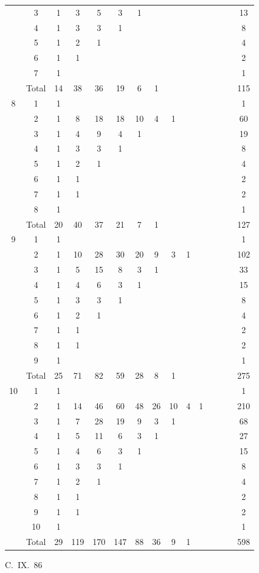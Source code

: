 \documentclass[11pt,a4paper]{article}
\begin{document}
{\begin{center}
\begin{longtable}{|c|c|c|c|c|c|c|c|c|c|c|c|c|c|c|}
  & 3 & 1 & 3 & 5 & 3 & 1 & & & & & & & & 13 \\
  & 4 & 1 & 3 & 3 & 1 & & & & & & & & & 8 \\
  & 5 & 1 & 2 & 1 & & & & & & & & & & 4 \\
  & 6 & 1 & 1 & & & & & & & & & & & 2 \\
  & 7 & 1 & & & & & & & & & & & & 1 \\
  & Total & 14 & 38 & 36 & 19 & 6 & 1 & & & & & & & 115 \\
\hline
8 & 1 & 1 & & & & & & & & & & & & 1 \\
  & 2 & 1 & 8 & 18 & 18 & 10 & 4 & 1 & & & & & & 60 \\
  & 3 & 1 & 4 & 9 & 4 & 1 & & & & & & & & 19 \\
  & 4 & 1 & 3 & 3 & 1 & & & & & & & & & 8 \\
  & 5 & 1 & 2 & 1 & & & & & & & & & & 4 \\
  & 6 & 1 & 1 & & & & & & & & & & & 2 \\
  & 7 & 1 & 1 & & & & & & & & & & & 2 \\
  & 8 & 1 & & & & & & & & & & & & 1 \\
  & Total & 20 & 40 & 37 & 21 & 7 & 1 & & & & & & & 127 \\
\hline
9 & 1 & 1 & & & & & & & & & & & & 1 \\
  & 2 & 1 & 10 & 28 & 30 & 20 & 9 & 3 & 1 & & & & & 102 \\
  & 3 & 1 & 5 & 15 & 8 & 3 & 1 & & & & & & & 33 \\
  & 4 & 1 & 4 & 6 & 3 & 1 & & & & & & & & 15 \\
  & 5 & 1 & 3 & 3 & 1 & & & & & & & & & 8 \\
  & 6 & 1 & 2 & 1 & & & & & & & & & & 4 \\
  & 7 & 1 & 1 & & & & & & & & & & & 2 \\
  & 8 & 1 & 1 & & & & & & & & & & & 2 \\
  & 9 & 1 & & & & & & & & & & & & 1 \\
  & Total & 25 & 71 & 82 & 59 & 28 & 8 & 1 & & & & & & 275 \\
\hline
10 & 1 & 1 & & & & & & & & & & & & 1 \\
  & 2 & 1 & 14 & 46 & 60 & 48 & 26 & 10 & 4 & 1 & & & & 210 \\
  & 3 & 1 & 7 & 28 & 19 & 9 & 3 & 1 & & & & & & 68 \\
  & 4 & 1 & 5 & 11 & 6 & 3 & 1 & & & & & & & 27 \\
  & 5 & 1 & 4 & 6 & 3 & 1 & & & & & & & & 15 \\
  & 6 & 1 & 3 & 3 & 1 & & & & & & & & & 8 \\
  & 7 & 1 & 2 & 1 & & & & & & & & & & 4 \\
  & 8 & 1 & 1 & & & & & & & & & & & 2 \\
  & 9 & 1 & 1 & & & & & & & & & & & 2 \\
  & 10 & 1 & & & & & & & & & & & & 1 \\
  & Total & 29 & 119 & 170 & 147 & 88 & 36 & 9 & 1 & & & & & 598 \\
\hline
\end{longtable}
\end{center}
\hfill C.~IX.\ 86

} %
\end{document}
